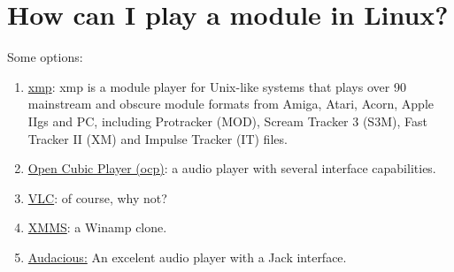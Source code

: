 \section{How can I play a module in Linux?}
Some options:
\begin{enumerate}

\item \href{http://sourceforge.net/projects/xmp/}{xmp}: xmp is a
  module player for Unix-like systems that plays over 90 mainstream
  and obscure module formats from Amiga, Atari, Acorn, Apple IIgs and
  PC, including Protracker (MOD), Scream Tracker 3 (S3M), Fast Tracker
  II (XM) and Impulse Tracker (IT) files.

\item \href{http://www.cubic.org/player/}{Open Cubic Player (ocp)}: a
  audio player with several interface capabilities.

\item \href{http://en.wikipedia.org/wiki/VLC_media_player}{VLC}: of
  course, why not?

\item \href{http://en.wikipedia.org/wiki/XMMS}{XMMS}: a Winamp clone.

\item
  \href{http://en.wikipedia.org/wiki/Audacious\_\%28software\%29}{Audacious:}
  An excelent audio player with a Jack interface.

\end{enumerate}

